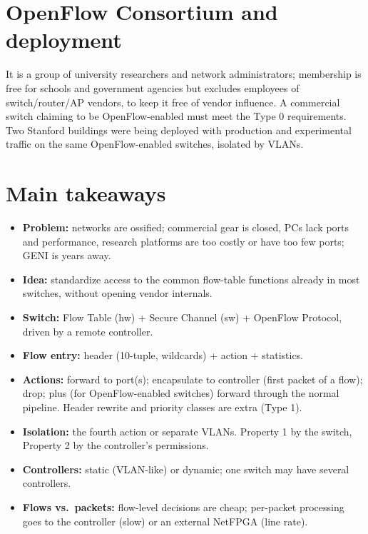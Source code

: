\section{OpenFlow Consortium and deployment}
 It is a group of university researchers and network administrators; membership is free for schools and government agencies but excludes employees of switch/router/AP vendors, to keep it free of vendor influence. A commercial switch claiming to be OpenFlow-enabled must meet the Type 0 requirements. Two Stanford buildings were being deployed with production and experimental traffic on the same OpenFlow-enabled switches, isolated by VLANs.

\section{Main takeaways}
\begin{itemize}
\item \textbf{Problem:} networks are ossified; commercial gear is closed, PCs lack ports and performance, research platforms are too costly or have too few ports; GENI is years away.
\item \textbf{Idea:} standardize access to the common flow-table functions already in most switches, without opening vendor internals.
\item \textbf{Switch:} Flow Table (hw) + Secure Channel (sw) + OpenFlow Protocol, driven by a remote controller.
\item \textbf{Flow entry:} header (10-tuple, wildcards) + action + statistics.
\item \textbf{Actions:} forward to port(s); encapsulate to controller (first packet of a flow); drop; plus (for OpenFlow-enabled switches) forward through the normal pipeline. Header rewrite and priority classes are extra (Type 1).
\item \textbf{Isolation:} the fourth action or separate VLANs. Property 1 by the switch, Property 2 by the controller's permissions.
\item \textbf{Controllers:} static (VLAN-like) or dynamic; one switch may have several controllers.
\item \textbf{Flows vs.\ packets:} flow-level decisions are cheap; per-packet processing goes to the controller (slow) or an external NetFPGA (line rate).
\end{itemize}
